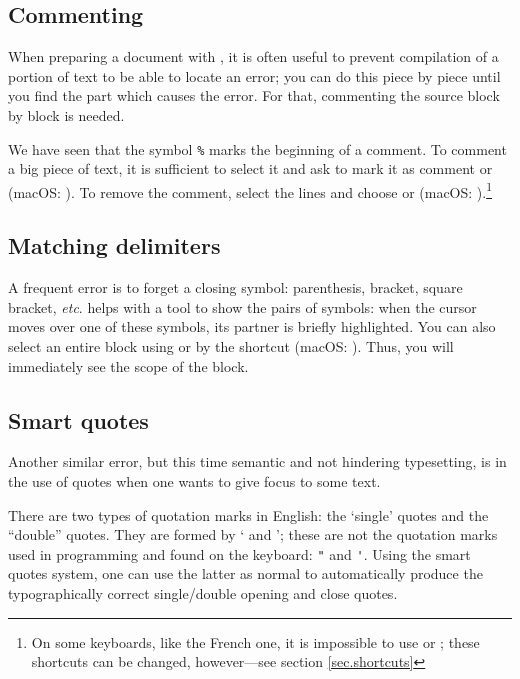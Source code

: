 \subsection{Commenting}

When preparing a document with {\AllTeX}, it is often useful to prevent compilation of a portion of text to be able to locate an error; you can do this piece by piece until you find the part which causes the error. For that, commenting the source block by block is needed. 

We have seen that the symbol \verb+%+ marks the beginning of a comment.
To comment a big piece of text, it is sufficient to select it and ask to mark it as comment \submenu{} or \keysequence{Ctrl+Shift+]} (macOS: \keysequence{Cmd+Shift+]}). To remove the comment, select the lines and choose \submenu{} or \keysequence{Ctrl+Shift+[} (macOS: \keysequence{Cmd+Shift+[}).\footnote{On some keyboards, like the French one, it is impossible to use \keysequence{Ctrl+Shift+[} or \keysequence{Ctrl+Shift+]}; these shortcuts can be changed, however---see section \ref{sec.shortcuts}}

\subsection{Matching delimiters}

A frequent error is to forget a closing symbol: parenthesis, bracket, square bracket, \emph{etc}. {\Tw} helps with a tool to show the pairs of symbols: when the cursor moves over one of these symbols, its partner is briefly highlighted. You can also select an entire block using \submenu{} or by the shortcut  (macOS: ). Thus, you will immediately see the scope of the block.

\subsection{Smart quotes}

Another similar error, but this time semantic and not hindering typesetting, is in the use of quotes when one wants to give focus to some text.

There are two types of quotation marks in English: the `single' quotes and the ``double'' quotes. They are formed by ` and '; these are not the quotation marks used in programming and found on the keyboard: \verb|"| and \verb|'|. Using the {\Tw} smart quotes system, one can use the latter as normal to automatically produce the typographically correct single/double opening and close quotes.

